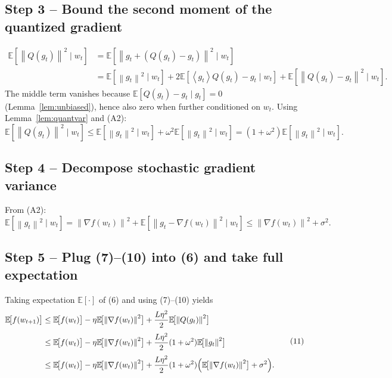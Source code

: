 \documentclass{article}
\newcommand{\E}{\mathbb{E}}
\newcommand{\norm}[1]{\left\lVert#1\right\rVert}
\newcommand{\inner}[1]{\left\langle#1\right\rangle}
\begin{document}
\subsection*{Step 3 – Bound the second moment of the quantized gradient}
\[
\begin{aligned}
\E\!\left[\norm{Q(g_{t})}^{2}\mid w_{t}\right]
&= \E\!\left[\norm{g_{t}+ (Q(g_{t})-g_{t})}^{2}\mid w_{t}\right] \\[1mm]
&= \E\!\left[\norm{g_{t}}^{2}\mid w_{t}\right]
   +2\E\!\left[\inner{g_{t}}{Q(g_{t})-g_{t}}\mid w_{t}\right]
   +\E\!\left[\norm{Q(g_{t})-g_{t}}^{2}\mid w_{t}\right].
\end{aligned}
\tag{8}
\]
The middle term vanishes because $\E[Q(g_{t})-g_{t}\mid g_{t}]=0$ (Lemma~\ref{lem:unbiased}), hence also zero when further conditioned on $w_{t}$.  Using Lemma~\ref{lem:quantvar} and (A2):
\[
\E\!\left[\norm{Q(g_{t})}^{2}\mid w_{t}\right]
\le \E\!\left[\norm{g_{t}}^{2}\mid w_{t}\right]
    +\omega^{2}\E\!\left[\norm{g_{t}}^{2}\mid w_{t}\right]
= (1+\omega^{2})\E\!\left[\norm{g_{t}}^{2}\mid w_{t}\right]. \tag{9}
\]

\subsection*{Step 4 – Decompose stochastic gradient variance}
From (A2):
\[
\E\!\left[\norm{g_{t}}^{2}\mid w_{t}\right]
= \norm{\nabla f(w_{t})}^{2}
  +\E\!\left[\norm{g_{t}-\nabla f(w_{t})}^{2}\mid w_{t}\right]
\le \norm{\nabla f(w_{t})}^{2} + \sigma^{2}. \tag{10}
\]

\subsection*{Step 5 – Plug (7)–(10) into (6) and take full expectation}
Taking expectation $\E[\cdot]$ of (6) and using (7)–(10) yields
\[
\begin{aligned}
\E\!\bigl[f(w_{t+1})\bigr]
&\le \E\!\bigl[f(w_{t})\bigr]
   -\eta\E\!\bigl[\norm{\nabla f(w_{t})}^{2}\bigr]
   +\frac{L\eta^{2}}{2}\E\!\bigl[\norm{Q(g_{t})}^{2}\bigr] \\[1mm]
&\le \E\!\bigl[f(w_{t})\bigr]
   -\eta\E\!\bigl[\norm{\nabla f(w_{t})}^{2}\bigr]
   +\frac{L\eta^{2}}{2}(1+\omega^{2})\E\!\bigl[\norm{g_{t}}^{2}\bigr] \\[1mm]
&\le \E\!\bigl[f(w_{t})\bigr]
   -\eta\E\!\bigl[\norm{\nabla f(w_{t})}^{2}\bigr]
   +\frac{L\eta^{2}}{2}(1+\omega^{2})\Bigl(\E\!\bigl[\norm{\nabla f(w_{t})}^{2}\bigr]+\sigma^{2}\Bigr).
\end{aligned}
\tag{11}
\]
\end{document}
